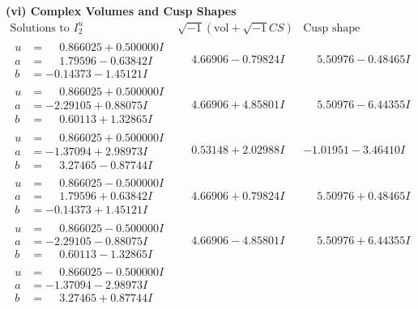 \documentclass[1p]{elsarticle_modified}
\theoremstyle{definition}
\newcommand{\I}{\sqrt{-1}}
\begin{document}
\newpage\flushleft \textbf{(vi) Complex Volumes and Cusp Shapes}
$$\begin{array}{c|c|c}  
\text{Solutions to }I^u_{2}& \I (\text{vol} + \sqrt{-1}CS) & \text{Cusp shape}\\
 \hline 
\begin{aligned}
u &= \phantom{-}0.866025 + 0.500000 I \\
a &= \phantom{-}1.79596 - 0.63842 I \\
b &= -0.14373 - 1.45121 I\end{aligned}
 & \phantom{-}4.66906 - 0.79824 I & \phantom{-}5.50976 - 0.48465 I \\ \hline\begin{aligned}
u &= \phantom{-}0.866025 + 0.500000 I \\
a &= -2.29105 + 0.88075 I \\
b &= \phantom{-}0.60113 + 1.32865 I\end{aligned}
 & \phantom{-}4.66906 + 4.85801 I & \phantom{-}5.50976 - 6.44355 I \\ \hline\begin{aligned}
u &= \phantom{-}0.866025 + 0.500000 I \\
a &= -1.37094 + 2.98973 I \\
b &= \phantom{-}3.27465 - 0.87744 I\end{aligned}
 & \phantom{-}0.53148 + 2.02988 I & -1.01951 - 3.46410 I \\ \hline\begin{aligned}
u &= \phantom{-}0.866025 - 0.500000 I \\
a &= \phantom{-}1.79596 + 0.63842 I \\
b &= -0.14373 + 1.45121 I\end{aligned}
 & \phantom{-}4.66906 + 0.79824 I & \phantom{-}5.50976 + 0.48465 I \\ \hline\begin{aligned}
u &= \phantom{-}0.866025 - 0.500000 I \\
a &= -2.29105 - 0.88075 I \\
b &= \phantom{-}0.60113 - 1.32865 I\end{aligned}
 & \phantom{-}4.66906 - 4.85801 I & \phantom{-}5.50976 + 6.44355 I \\ \hline\begin{aligned}
u &= \phantom{-}0.866025 - 0.500000 I \\
a &= -1.37094 - 2.98973 I \\
b &= \phantom{-}3.27465 + 0.87744 I\end{aligned}

\end{array}$$
\end{document}
